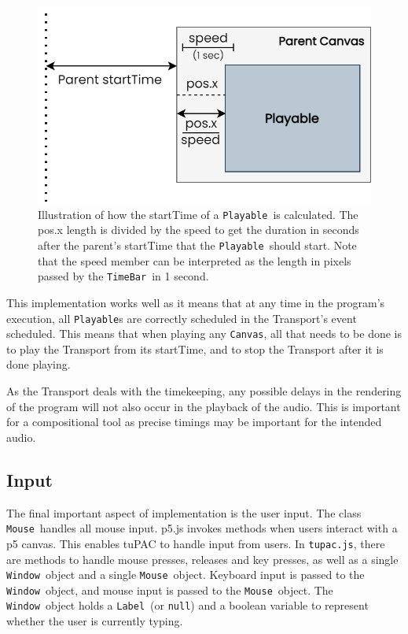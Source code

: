 \documentclass[12pt,a4paper,oneside,openright]{report}
\newcommand{\window}{\texttt{Window}}
\newcommand{\canvas}{\texttt{Canvas}}
\newcommand{\timebar}{\texttt{TimeBar}}
\newcommand{\playable}{\texttt{Playable}}
\newcommand{\mouse}{\texttt{Mouse}}
\newcommand{\labelT}{\texttt{Label}}
\begin{document}
\begin{figure}[h]
    \centering
    \includegraphics[scale=0.5]{images/startTime_calculation.png}
    \caption{Illustration of how the startTime of a \playable\ is calculated. The pos.x length is divided by the speed to get the duration in seconds after the parent's startTime that the \playable\ should start. Note that the speed member can be interpreted as the length in pixels passed by the \timebar\ in 1 second.}
    \label{fig:start_calc}
\end{figure}

This implementation works well as it means that at any time in the program's execution, all \playable s are correctly scheduled in the Transport's event scheduled. This means that when playing any \canvas, all that needs to be done is to play the Transport from its startTime, and to stop the Transport after it is done playing.

As the Transport deals with the timekeeping, any possible delays in the rendering of the program will not also occur in the playback of the audio. This is important for a compositional tool as precise timings may be important for the intended audio.

\subsection{Input}
The final important aspect of implementation is the user input. The class \mouse\ handles all mouse input. p5.js invokes methods when users interact with a p5 canvas. This enables tuPAC to handle input from users. In \verb|tupac.js|, there are methods to handle mouse presses, releases and key presses, as well as a single \window\ object and a single \mouse\ object. Keyboard input is passed to the \window\ object, and mouse input is passed to the \mouse\ object. The \window\ object holds a \labelT\ (or \verb|null|) and a boolean variable to represent whether the user is currently typing.
\end{document}
